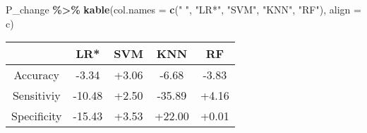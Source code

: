 \documentclass[
]{article}
\newenvironment{Shaded}{\begin{snugshade}}{\end{snugshade}}
\newcommand{\AttributeTok}[1]{\textcolor[rgb]{0.13,0.29,0.53}{#1}}
\newcommand{\FunctionTok}[1]{\textcolor[rgb]{0.13,0.29,0.53}{\textbf{#1}}}
\newcommand{\NormalTok}[1]{#1}
\newcommand{\SpecialCharTok}[1]{\textcolor[rgb]{0.81,0.36,0.00}{\textbf{#1}}}
\newcommand{\StringTok}[1]{\textcolor[rgb]{0.31,0.60,0.02}{#1}}
\begin{document}
\begin{Shaded}
\begin{Highlighting}[]
\NormalTok{P\_change }\SpecialCharTok{\%\textgreater{}\%}
  \FunctionTok{kable}\NormalTok{(}\AttributeTok{col.names =} \FunctionTok{c}\NormalTok{(}\StringTok{" "}\NormalTok{, }\StringTok{"LR*"}\NormalTok{, }\StringTok{"SVM"}\NormalTok{, }\StringTok{"KNN"}\NormalTok{, }\StringTok{"RF"}\NormalTok{), }\AttributeTok{align =} \StringTok{\textquotesingle{}c\textquotesingle{}}\NormalTok{)}
\end{Highlighting}
\end{Shaded}

\begin{longtable}[]{@{}ccccc@{}}
\toprule\noalign{}
& LR* & SVM & KNN & RF \\
\midrule\noalign{}
\endhead
\bottomrule\noalign{}
\endlastfoot
Accuracy & -3.34 & +3.06 & -6.68 & -3.83 \\
Sensitiviy & -10.48 & +2.50 & -35.89 & +4.16 \\
Specificity & -15.43 & +3.53 & +22.00 & +0.01 \\
\end{longtable}
\end{document}
